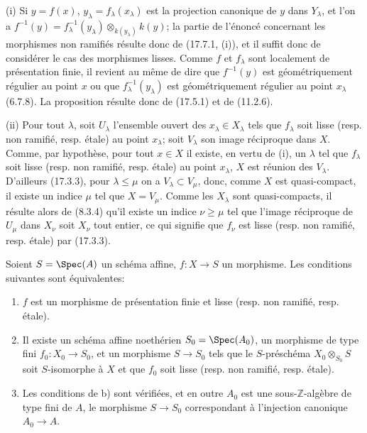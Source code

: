 (i) Si $y=f(x)$, $y_\lambda=f_\lambda(x_\lambda)$ est la projection canonique de $y$ dans $Y_\lambda$, et l'on a $f^{-1}(y)=f_\lambda^{-1}(y_\lambda)\otimes_{k(y_\lambda)}k(y)$; la partie de l'énoncé concernant les morphismes non ramifiés résulte donc de (17.7.1, (i)), et il suffit donc de considérer le cas des morphismes lisses. Comme $f$ et $f_\lambda$ sont localement de présentation finie, il revient au même de dire que $f^{-1}(y)$ est géométriquement régulier au point $x$ ou que $f_\lambda^{-1}(y_\lambda)$ est géométriquement régulier au point $x_\lambda$ (6.7.8). La proposition résulte donc de (17.5.1) et de (11.2.6).

(ii) Pour tout $\lambda$, soit $U_\lambda$ l'ensemble ouvert des $x_\lambda\in X_\lambda$ tels que $f_\lambda$ soit lisse (resp. non ramifié, resp. étale) au point $x_\lambda$; soit $V_\lambda$ son image réciproque dans $X$. Comme, par hypothèse, pour tout $x\in X$ il existe, en vertu de (i), un $\lambda$ tel que $f_\lambda$ soit lisse (resp. non ramifié, resp. étale) au point $x_\lambda$, $X$ est réunion des $V_\lambda$. D'ailleurs (17.3.3), pour $\lambda\leq\mu$ on a $V_\lambda\subset V_\mu$, donc, comme $X$ est quasi-compact, il existe un indice $\mu$ tel que $X=V_\mu$. Comme les $X_\lambda$ sont quasi-compacts, il résulte alors de (8.3.4) qu'il existe un indice $\nu\geq\mu$ tel que l'image réciproque de $U_\mu$ dans $X_\nu$ soit $X_\nu$ tout entier, ce qui signifie que $f_\nu$ est lisse (resp. non ramifié, resp. étale) par (17.3.3).

\begin{corollary}[17.7.9]
\label{IV.17.7.9}
Soient $S=\Spec(A)$ un schéma affine, $f:X\to S$ un morphisme. Les conditions suivantes sont équivalentes:
\begin{enumerate}
  \item[a)] $f$ est un morphisme de présentation finie et lisse (resp. non ramifié, resp. étale).


  \item[b)] Il existe un schéma affine noethérien $S_0=\Spec(A_0)$, un morphisme de type fini $f_0:X_0\to S_0$, et un morphisme $S\to S_0$ tels que le $S$-préschéma $X_0\otimes_{S_0}S$ soit $S$-isomorphe à $X$ et que $f_0$ soit lisse (resp. non ramifié, resp. étale).
  \item[c)] Les conditions de b) sont vérifiées, et en outre $A_0$ est une sous-$\mathbb{Z}$-algèbre de type fini de $A$, le morphisme $S\to S_0$ correspondant à l'injection canonique $A_0\to A$.
\end{enumerate}
\end{corollary}

